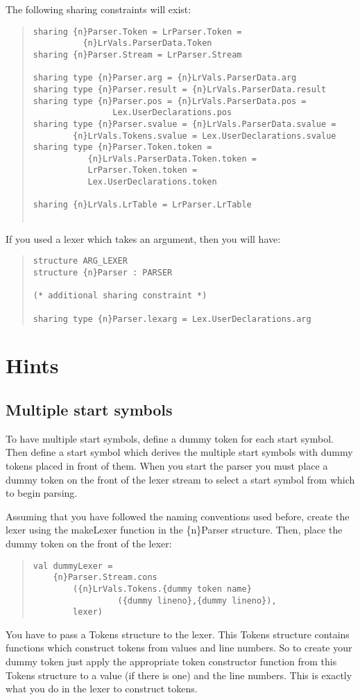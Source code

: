 The following sharing constraints will exist:
\begin{quote}
\begin{verbatim}
sharing {n}Parser.Token = LrParser.Token =
          {n}LrVals.ParserData.Token
sharing {n}Parser.Stream = LrParser.Stream

sharing type {n}Parser.arg = {n}LrVals.ParserData.arg
sharing type {n}Parser.result = {n}LrVals.ParserData.result
sharing type {n}Parser.pos = {n}LrVals.ParserData.pos =
                Lex.UserDeclarations.pos
sharing type {n}Parser.svalue = {n}LrVals.ParserData.svalue =
        {n}LrVals.Tokens.svalue = Lex.UserDeclarations.svalue
sharing type {n}Parser.Token.token =
           {n}LrVals.ParserData.Token.token =
           LrParser.Token.token =
           Lex.UserDeclarations.token

sharing {n}LrVals.LrTable = LrParser.LrTable
        
\end{verbatim}
\end{quote}

If you used a lexer which takes an argument, then you will
have:
\begin{quote}
\begin{verbatim}
structure ARG_LEXER
structure {n}Parser : PARSER

(* additional sharing constraint *)

sharing type {n}Parser.lexarg = Lex.UserDeclarations.arg
\end{verbatim}
\end{quote}

\section{Hints}
\subsection{Multiple start symbols}
To have multiple start symbols, define a dummy token for each
start symbol.  Then define a start symbol which derives the
multiple start symbols with dummy tokens placed in front of
them.  When you start the parser you must place a dummy token
on the front of the lexer stream to select a start symbol
from which to begin parsing.

Assuming that you have followed the naming conventions used before,
create the lexer using the makeLexer function in the \{n\}Parser structure.
Then, place the dummy token on the front of the lexer:
\begin{quote}
\begin{verbatim}
val dummyLexer =
    {n}Parser.Stream.cons
        ({n}LrVals.Tokens.{dummy token name}
                 ({dummy lineno},{dummy lineno}),
        lexer)
\end{verbatim}
\end{quote}
You have to pass a Tokens structure to the lexer.  This Tokens structure
contains functions which construct tokens from values and line numbers.
So to create your dummy token just apply the appropriate token constructor
function from this Tokens structure to a value (if there is one) and the
line numbers.   This is exactly what you do in the lexer to construct tokens.

